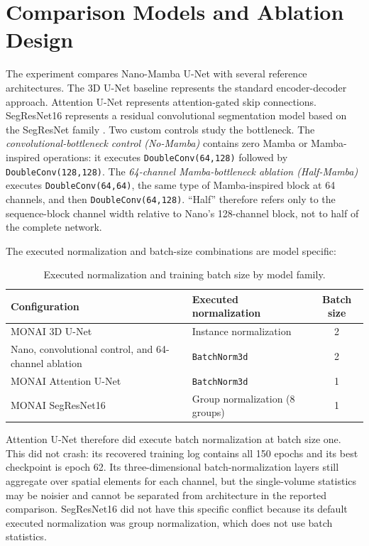 \section{Comparison Models and Ablation Design}
The experiment compares Nano-Mamba U-Net with several reference architectures. The 3D U-Net baseline represents the standard encoder-decoder approach. Attention U-Net represents attention-gated skip connections. SegResNet16 represents a residual convolutional segmentation model based on the SegResNet family \citep{myronenko2019segresnet}. Two custom controls study the bottleneck. The \emph{convolutional-bottleneck control (No-Mamba)} contains zero Mamba or Mamba-inspired operations: it executes \texttt{DoubleConv(64,128)} followed by \texttt{DoubleConv(128,128)}. The \emph{64-channel Mamba-bottleneck ablation (Half-Mamba)} executes \texttt{DoubleConv(64,64)}, the same type of Mamba-inspired block at 64 channels, and then \texttt{DoubleConv(64,128)}. ``Half'' therefore refers only to the sequence-block channel width relative to Nano's 128-channel block, not to half of the complete network.

The executed normalization and batch-size combinations are model specific:
\begin{table}[hbt!]
\centering
\caption{Executed normalization and training batch size by model family.}
\label{tab:normalization_batch_contract}
\begin{tabularx}{\textwidth}{@{}>{\raggedright\arraybackslash}p{}>{\raggedright\arraybackslash}Xc@{}}
\hline
Configuration & Executed normalization & Batch size \\
\hline
MONAI 3D U-Net & Instance normalization & 2 \\
Nano, convolutional control, and 64-channel ablation & \texttt{BatchNorm3d} & 2 \\
MONAI Attention U-Net & \texttt{BatchNorm3d} & 1 \\
MONAI SegResNet16 & Group normalization (8 groups) & 1 \\
\hline
\end{tabularx}
\end{table}

Attention U-Net therefore did execute batch normalization at batch size one.
This did not crash: its recovered training log contains all 150 epochs and its
best checkpoint is epoch 62. Its three-dimensional batch-normalization layers
still aggregate over spatial elements for each channel, but the single-volume
statistics may be noisier and cannot be separated from architecture in the
reported comparison. SegResNet16 did not have this specific conflict because
its default executed normalization was group normalization, which does not use
batch statistics.

